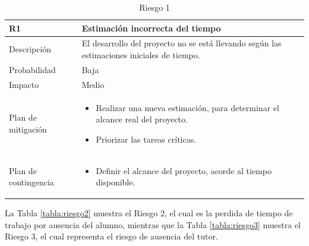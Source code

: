 \begin{table}[htb]
    \footnotesize
    \begin{tabular}{|>{\arraybackslash}m{3.15cm} | >{\arraybackslash}m{10cm} |}
        \hline
        \vspace{0.5em} \textbf{ R1 } \vspace{0.5em} & \vspace{0.5em} \textbf{Estimación incorrecta del tiempo} \vspace{0.5em} \\
        \hline 
        \vspace{0.5em} Descripción \vspace{0.5em} & \vspace{0.5em} El desarrollo del proyecto no se está llevando según las estimaciones iniciales de tiempo. \vspace{0.5em} \\
        \hline
        \vspace{0.5em} Probabilidad \vspace{0.5em} & \vspace{0.5em} Baja \vspace{0.5em} \\
        \hline
        \vspace{0.5em} Impacto \vspace{0.5em} & \vspace{0.5em} Medio \vspace{0.5em} \\
        \hline
        Plan de mitigación & 
        \begin{itemize}
            \item Realizar una nueva estimación, para determinar el alcance real del proyecto.
            \item Priorizar las tareas críticas.
        \end{itemize} \\
        \hline
        Plan de contingencia & 
        \begin{itemize}
            \item Definir el alcance del proyecto, acorde al tiempo disponible.
        \end{itemize} \\
        \hline
    \end{tabular}
    \caption{Riesgo 1}
    \label{tabla:riesgo1}
\end{table}

La Tabla \ref{tabla:riesgo2} muestra el Riesgo 2, el cual es la perdida de tiempo de trabajo por ausencia del alumno, mientras que la Tabla \ref{tabla:riesgo3} muestra el Riesgo 3, el cual representa el riesgo de ausencia del tutor. 


